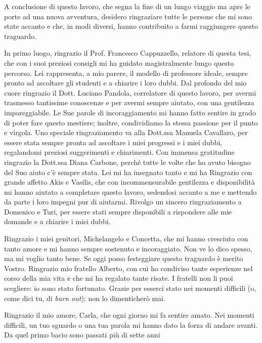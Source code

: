 

A conclusione di questo lavoro, che segna la fine di un lungo viaggio ma apre le porte ad una nuova avventura, desidero ringraziare tutte le persone che mi sono state accanto e che, in modi diversi, hanno contribuito a farmi raggiungere questo traguardo.

In primo luogo, ringrazio il Prof. Francesco Cappuzzello, relatore di questa tesi, che con i suoi preziosi consigli mi ha guidato magistralmente lungo questo percorso.
Lei rappresenta, a mio parere, il modello di professore ideale, sempre pronto ad ascoltare gli studenti e a chiarire i loro dubbi.
Dal profondo del mio cuore ringrazio il Dott. Luciano Pandola, correlatore di questo lavoro, per avermi trasmesso tantissime conoscenze e per avermi sempre aiutato, con una gentilezza impareggiabile.
Le Sue parole di incoraggiamento mi hanno fatto sentire in grado di poter fare questo mestiere; inoltre, condividiamo la stessa passione per il punto e virgola.
Uno speciale ringraziamento va alla Dott.ssa Manuela Cavallaro, per essere stata sempre pronta ad ascoltare i miei progressi e i miei dubbi, regalandomi preziosi suggerimenti e chiarimenti.
Con immensa gratitudine ringrazio la Dott.ssa Diana Carbone, perché tutte le volte che ho avuto bisogno del Suo aiuto c'è sempre stata.
Lei mi ha insegnato tanto e mi ha 
Ringrazio con grande affetto Akis e Vasilis, che con incommensurabile gentilezza e disponibilità mi hanno aiutato a completare questo lavoro, sedendosi accanto a me e mettendo da parte i loro impegni pur di aiutarmi.
Rivolgo un sincero ringraziamento a Domenico e Turi, per essere stati sempre disponibili a rispondere alle mie domande e a chiarire i miei dubbi.


Ringrazio i miei genitori, Michelangelo e Concetta, che mi hanno cresciuto con tanto amore e mi hanno sempre sostenuto e incoraggiato.
Non ve lo dico spesso, ma mi voglio tanto bene.
Se oggi posso festeggiare questo traguardo è merito Vostro.
Ringrazio mio fratello Alberto, con cui ho condiviso tante esperienze nel corso della mia vita e che mi ha regalato tante risate.
I fratelli non li puoi scegliere: io sono stato fortunato.
Grazie per esserci stato nei momenti difficili (o, come dici tu, di \emph{burn out}): non lo dimenticherò mai.

Ringrazio il mio amore, Carla, che ogni giorno mi fa sentire amato.
Nei momenti difficili, un tuo sguardo o una tua parola mi hanno dato la forza di andare avanti.
Da quel primo bacio sono passati più di sette anni 